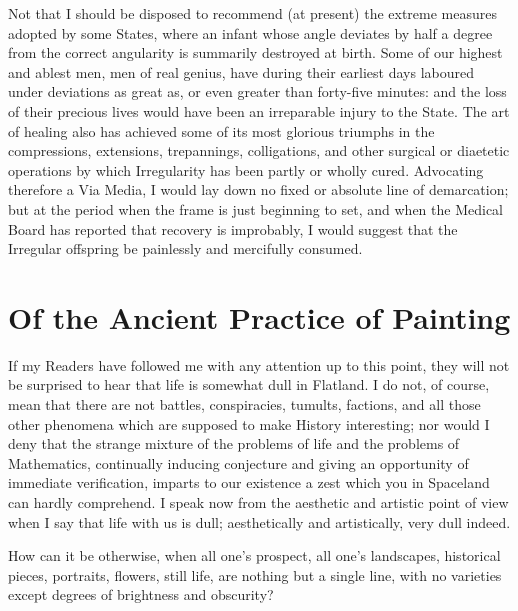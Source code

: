 \documentclass[12pt, a4paper, oneside]{memoir}
\begin{document}
Not that I should be disposed to recommend (at present) the extreme measures
adopted by some States, where an infant whose angle deviates by half a degree
from the correct angularity is summarily destroyed at birth.  Some of our
highest and ablest men, men of real genius, have during their earliest days
laboured under deviations as great as, or even greater than forty-five
minutes: and the loss of their precious lives would have been an irreparable
injury to the State. The art of healing also has achieved some of its most
glorious triumphs in the compressions, extensions, trepannings, colligations,
and other surgical or diaetetic operations by which Irregularity has been
partly or wholly cured. Advocating therefore a Via Media, I would lay down no
fixed or absolute line of demarcation; but at the period when the frame is
just beginning to set, and when the Medical Board has reported that recovery
is improbably, I would suggest that the Irregular offspring be painlessly and
mercifully consumed.






\chapter{Of the Ancient Practice of Painting}
If my Readers have followed me with any attention up to this point, they will
not be surprised to hear that life is somewhat dull in Flatland. I do not, of
course, mean that there are not battles, conspiracies, tumults, factions, and
all those other phenomena which are supposed to make History interesting; nor
would I deny that the strange mixture of the problems of life and the problems
of Mathematics, continually inducing conjecture and giving an opportunity of
immediate verification, imparts to our existence a zest which you in Spaceland
can hardly comprehend. I speak now from the aesthetic and artistic point of
view when I say that life with us is dull; aesthetically and artistically,
very dull indeed.

How can it be otherwise, when all one's prospect, all one's landscapes,
historical pieces, portraits, flowers, still life, are nothing but a single
line, with no varieties except degrees of brightness and obscurity?
\end{document}
